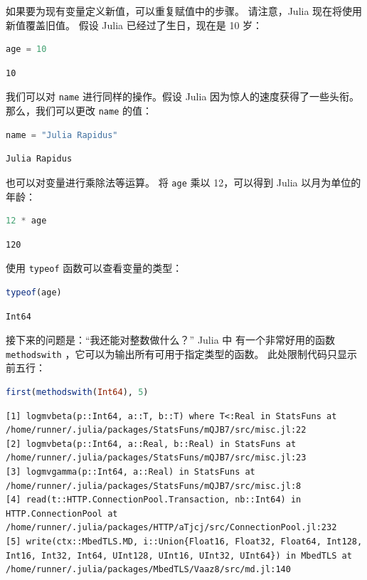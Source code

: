\documentclass[
  notoc %
]{tufte-book}
\newcommand{\passthrough}[1]{#1}
\begin{document}
如果要为现有变量定义新值，可以重复赋值中的步骤。 请注意，Julia
现在将使用新值覆盖旧值。 假设 Julia 已经过了生日，现在是 10 岁：

\begin{lstlisting}[language=Julia]
age = 10
\end{lstlisting}

\begin{lstlisting}[language=Output]
10
\end{lstlisting}

我们可以对 \passthrough{\lstinline!name!} 进行同样的操作。假设 Julia
因为惊人的速度获得了一些头衔。那么，我们可以更改
\passthrough{\lstinline!name!} 的值：

\begin{lstlisting}[language=Julia]
name = "Julia Rapidus"
\end{lstlisting}

\begin{lstlisting}[language=Output]
Julia Rapidus
\end{lstlisting}

也可以对变量进行乘除法等运算。 将 \passthrough{\lstinline!age!} 乘以
12，可以得到 Julia 以月为单位的年龄：

\begin{lstlisting}[language=Julia]
12 * age
\end{lstlisting}

\begin{lstlisting}[language=Output]
120
\end{lstlisting}

使用 \passthrough{\lstinline!typeof!} 函数可以查看变量的类型：

\begin{lstlisting}[language=Julia]
typeof(age)
\end{lstlisting}

\begin{lstlisting}[language=Output]
Int64
\end{lstlisting}

接下来的问题是：``我还能对整数做什么？'' Julia 中 有一个非常好用的函数
\passthrough{\lstinline!methodswith!}
，它可以为输出所有可用于指定类型的函数。 此处限制代码只显示前五行：

\begin{lstlisting}[language=Julia]
first(methodswith(Int64), 5)
\end{lstlisting}

\begin{lstlisting}[language=Output]
[1] logmvbeta(p::Int64, a::T, b::T) where T<:Real in StatsFuns at /home/runner/.julia/packages/StatsFuns/mQJB7/src/misc.jl:22
[2] logmvbeta(p::Int64, a::Real, b::Real) in StatsFuns at /home/runner/.julia/packages/StatsFuns/mQJB7/src/misc.jl:23
[3] logmvgamma(p::Int64, a::Real) in StatsFuns at /home/runner/.julia/packages/StatsFuns/mQJB7/src/misc.jl:8
[4] read(t::HTTP.ConnectionPool.Transaction, nb::Int64) in HTTP.ConnectionPool at /home/runner/.julia/packages/HTTP/aTjcj/src/ConnectionPool.jl:232
[5] write(ctx::MbedTLS.MD, i::Union{Float16, Float32, Float64, Int128, Int16, Int32, Int64, UInt128, UInt16, UInt32, UInt64}) in MbedTLS at /home/runner/.julia/packages/MbedTLS/Vaaz8/src/md.jl:140
\end{lstlisting}
\end{document}
